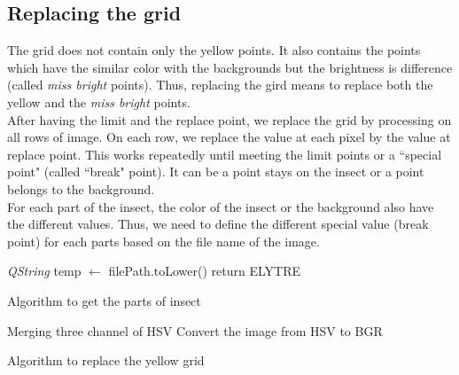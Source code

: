 \subsection{Replacing the grid}
The grid does not contain only the yellow points. It also contains the points which have the similar color with the backgrounds but the brightness is difference (called \textit{miss bright} points). Thus, replacing the gird means to replace both the yellow and the \textit{miss bright} points.\\
After having the limit and the replace point, we replace the grid by processing on all rows of image. On each row, we replace the value at each pixel by the value at replace point. This works repeatedly until meeting the limit points or a ``special point" (called ``break" point). It can be a point stays on the insect or a point belongs to the background.\\
For each part of the insect, the color of the insect or the background also have the different values. Thus, we need to define the different special value (break point) for each parts based on the file name of the image.\\
\IncMargin{1em}
\begin{algorithm}[H]
\Indm
{}
\Indp
\textit{QString} temp $\leftarrow$ filePath.toLower()\;
return ELYTRE\;
\caption{Algorithm to get the parts of insect}
\end{algorithm}
\DecMargin{1em}
\IncMargin{1em}
\begin{algorithm}[H]
\Indm
{}
\Indp
{}
Merging three channel of HSV\;
Convert the image from HSV to BGR\;
\caption{Algorithm to replace the yellow grid}
\end{algorithm}

